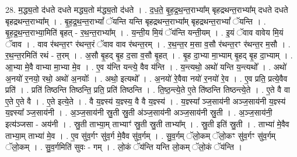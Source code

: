 \documentclass[17pt]{extarticle}
\begin{document}
28. म॒द्ध्य॒तो द॑धते दधते मद्ध्य॒तो म॑द्ध्य॒तो द॑धते । . द॒ध॒ते॒ बृ॒ह॒द्र॒थ॒न्त॒राभ्या᳚म् बृहद्रथन्त॒राभ्या᳚म् दधते दधते बृहद्रथन्त॒राभ्या᳚म् । . बृ॒ह॒द्र॒थ॒न्त॒राभ्यां᳚ ॅयन्ति यन्ति बृहद्रथन्त॒राभ्या᳚म् बृहद्रथन्त॒राभ्यां᳚ ॅयन्ति । . बृ॒ह॒द्र॒थ॒न्त॒राभ्या॒मिति॑ बृहत् - र॒थ॒न्त॒राभ्या᳚म् । . य॒न्ती॒य मि॒यं ॅय॑न्ति यन्ती॒यम् । . इ॒यं ॅवाव वावेय मि॒यं ॅवाव । . वाव र॑थन्त॒रꣳ र॑थन्त॒रं ॅवाव वाव र॑थन्त॒रम् । . र॒थ॒न्त॒र म॒सा व॒सौ र॑थन्त॒रꣳ र॑थन्त॒र म॒सौ । . र॒थ॒न्त॒रमिति॑ रथं - त॒रम् । . अ॒सौ बृ॒हद् बृ॒ह द॒सा व॒सौ बृ॒हत् । . बृ॒ह दा॒भ्या मा॒भ्याम् बृ॒हद् बृ॒ह दा॒भ्याम् । . आ॒भ्या मे॒वै वाभ्या मा॒भ्या मे॒व । . ए॒व य॑न्ति यन्त्ये॒ वैव य॑न्ति । . य॒न्त्यथो॒ अथो॑ यन्ति य॒न्त्यथो᳚ । . अथो॑ अ॒नयो॑ र॒नयो॒ रथो॒ अथो॑ अ॒नयोः᳚ । . अथो॒ इत्यथो᳚ । . अ॒नयो॑ रे॒वैवा नयो॑ र॒नयो॑ रे॒व । . ए॒व प्रति॒ प्रत्ये॒वैव प्रति॑ । . प्रति॑ तिष्ठन्ति तिष्ठन्ति॒ प्रति॒ प्रति॑ तिष्ठन्ति । . ति॒ष्ठ॒न्त्ये॒ते ए॒ते ति॑ष्ठन्ति तिष्ठन्त्ये॒ते । . ए॒ते वै वा ए॒ते ए॒ते वै । . ए॒ते इत्ये॒ते । . वै य॒ज्ञ्स्य॑ य॒ज्ञ्स्य॒ वै वै य॒ज्ञ्स्य॑ । . य॒ज्ञ्स्या᳚ ञ्ज॒साय॑नी अञ्ज॒साय॑नी य॒ज्ञ्स्य॑ य॒ज्ञ्स्या᳚ ञ्ज॒साय॑नी । . अ॒ञ्ज॒साय॑नी स्रु॒ती स्रु॒ती अ॑ञ्ज॒साय॑नी अञ्ज॒साय॑नी स्रु॒ती । . अ॒ञ्ज॒साय॑नी॒ इत्य॑ञ्जसा - अय॑नी । . स्रु॒ती ताभ्या॒म् ताभ्याꣳ॑ स्रु॒ती स्रु॒ती ताभ्या᳚म् । . स्रु॒ती इति॑ स्रु॒ती । . ताभ्या॑ मे॒वैव ताभ्या॒म् ताभ्या॑ मे॒व । . ए॒व सु॑व॒र्गꣳ सु॑व॒र्ग मे॒वैव सु॑व॒र्गम् । . सु॒व॒र्गम् ॅलो॒कम् ॅलो॒कꣳ सु॑व॒र्गꣳ सु॑व॒र्गम् ॅलो॒कम् । . सु॒व॒र्गमिति॑ सुवः - गम् । . लो॒कं ॅय॑न्ति यन्ति लो॒कम् ॅलो॒कं ॅय॑न्ति । \newline
\end{document}
